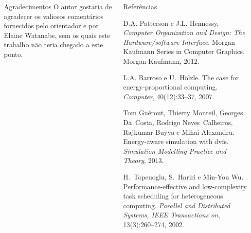 \documentclass[final]{beamer}
\begin{document}
\begin{frame}[t]
\begin{columns}[t]
\begin{column}{0.61\paperwidth}
\end{column}
\end{columns}

\begin{columns}[t] 
	\begin{column}{0.35\columnwidth}

		\begin{block}{Agradecimentos}
			O autor gostaria de agradecer os valiosos comentários fornecidos
			pelo orientador e por Elaine Watanabe, sem os quais este trabalho
			não teria chegado a este ponto.
		\end{block}
		
	\end{column}

	\begin{column}{0.61\columnwidth}
		\begin{block}{Referências}
			\footnotesize{\begin{thebibliography}{99}
			D.A. Patterson e J.L. Hennessy. {\em Computer Organization and Design: The Hardware/software
			  Interface}. Morgan Kaufmann Series in Computer Graphics. Morgan Kaufmann, 2012.

			L.A. Barroso e U.~H\"olzle.
			The case for energy-proportional computing.
			{\em Computer}, 40(12):33--37, 2007.

			Tom Gu{\'e}rout, Thierry Monteil, Georges Da~Costa, Rodrigo Neves~Calheiros,
			  Rajkumar Buyya e Mihai Alexandru.
			Energy-aware simulation with dvfs.
			{\em Simulation Modelling Practice and Theory}, 2013.

			H.~Topcuoglu, S.~Hariri e Min-You Wu.
			Performance-effective and low-complexity task scheduling for
			  heterogeneous computing.
			{\em Parallel and Distributed Systems, IEEE Transactions on},
			  13(3):260--274, 2002.

			\end{thebibliography}}

		\end{block}
	\end{column}
\end{columns}


\end{frame}
\end{document}
